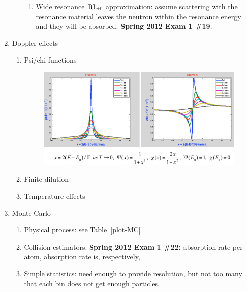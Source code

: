 \documentclass{school-22.211-notes}
\begin{document}
\begin{enumerate}
\begin{enumerate}
\begin{enumerate}
      \item Wide resonance $\left. \mathrm{RI}_{\mathrm{eff}} \right.$ approximation: assume scattering with the resonance material leaves the neutron within the resonance energy and they will be absorbed. \textbf{Spring 2012 Exam 1 \#19}.
      \end{enumerate}
  \end{enumerate}

\item Doppler effects
  \begin{enumerate}
    \item Psi/chi functions
      \begin{figure}
        \centering
        \includegraphics[width=6in]{images/r-m/psi-chi-plot.png}
      \end{figure}

    \item Finite dilution
    \item Temperature effects
  \end{enumerate}

\item Monte Carlo
  \begin{enumerate}
    \item Physical process:  see Table~\ref{plot-MC}
    \item Collision estimators: \textbf{Spring 2012 Exam 1 \#22:}   absorption  rate per atom, absorption rate is, respectively, 
    \item Simple statistics:  need enough to provide resolution, but not too many that each bin does not get enough particles.
  \end{enumerate}
  

\end{enumerate}
\end{document}
